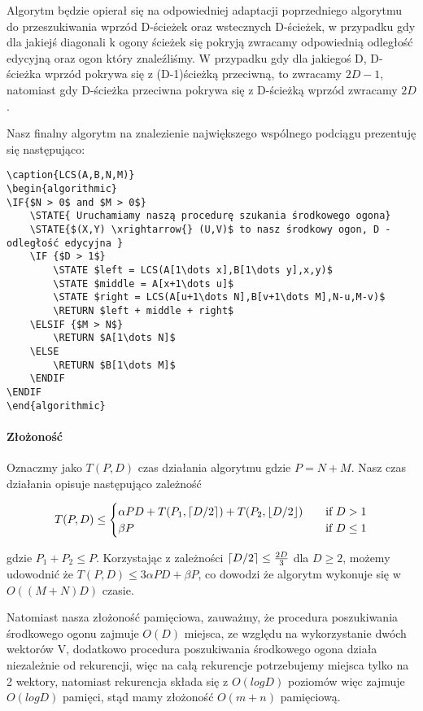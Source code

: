 Algorytm będzie opierał się na odpowiedniej adaptacji poprzedniego algorytmu do przeszukiwania wprzód D-ścieżek oraz wstecznych D-ścieżek, w przypadku gdy dla jakiejś diagonali k ogony ścieżek się pokryją zwracamy odpowiednią odległość edycyjną oraz ogon który znaleźliśmy. W przypadku gdy dla jakiegoś D, D-ścieżka wprzód pokrywa się z (D-1)ścieżką przeciwną, to zwracamy $2D - 1$, natomiast gdy D-ścieżka przeciwna pokrywa się z D-ścieżką wprzód zwracamy $2D$.

Nasz finalny algorytm na znalezienie największego wspólnego podciągu prezentuję się następująco:

\begin{verbatim}
\caption{LCS(A,B,N,M)}
\begin{algorithmic}
\IF{$N > 0$ and $M > 0$}
    \STATE{ Uruchamiamy naszą procedurę szukania środkowego ogona} 
    \STATE{$(X,Y) \xrightarrow{} (U,V)$ to nasz środkowy ogon, D - odległość edycyjna }
    \IF {$D > 1$}
        \STATE $left = LCS(A[1\dots x],B[1\dots y],x,y)$
        \STATE $middle = A[x+1\dots u]$
        \STATE $right = LCS(A[u+1\dots N],B[v+1\dots M],N-u,M-v)$
        \RETURN $left + middle + right$
    \ELSIF {$M > N$}
        \RETURN $A[1\dots N]$
    \ELSE
        \RETURN $B[1\dots M]$
    \ENDIF
\ENDIF
\end{algorithmic}
\end{verbatim}

\paragraph{Złożoność}

Oznaczmy jako $T(P,D)$ czas działania algorytmu gdzie $P = N + M$. Nasz czas działania opisuje następująco zależność

$$ 
T(P,D) \leq 
     \begin{cases}
       \alpha PD + T(P_{1},\lceil D/2\rceil) + T(P_{2}, \lfloor D/2\rfloor) &\quad\text{if } D > 1 \\
       \beta P &\quad\text{if } D \leq 1 \\
     \end{cases}
$$


gdzie $P_{1} + P_{2} \leq P$. Korzystając z zależności $\lceil D/2\rceil \leq \frac{2D}{3}$ dla $D \geq 2$, możemy udowodnić że $T(P,D) \leq 3\alpha PD + \beta P$, co dowodzi że algorytm wykonuje się w $O((M+N)D)$ czasie.
\vspace{4mm}    

Natomiast nasza złożoność pamięciowa, zauważmy, że procedura poszukiwania środkowego ogonu zajmuje $O(D)$ miejsca, ze względu na wykorzystanie dwóch wektorów V, dodatkowo procedura poszukiwania środkowego ogona działa niezależnie od rekurencji, więc na całą rekurencje potrzebujemy miejsca tylko na 2 wektory, natomiast rekurencja składa się z $O(logD)$ poziomów więc zajmuje $O(logD)$ pamięci, stąd mamy złożoność $O(m+n)$ pamięciową.

